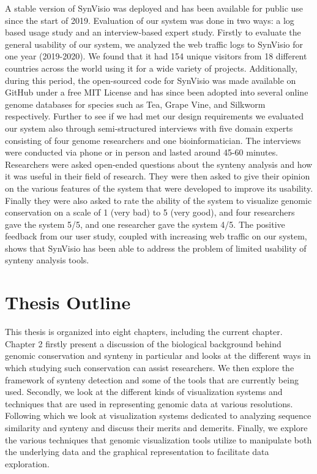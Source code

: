 A stable version of SynVisio was deployed and has been available for public use since the start of 2019. Evaluation of our system was done in two ways: a log based usage study and an interview-based expert study. Firstly to evaluate the general usability of our system, we analyzed the web traffic logs to SynVisio for one year (2019-2020). We found that it had 154 unique visitors from 18 different countries across the world using it for a wide variety of projects. Additionally, during this period, the open-sourced code for SynVisio was made available on GitHub under a free MIT License and has since been adopted into several online genome databases for species such as Tea, Grape Vine, and Silkworm respectively.
Further to see if we had met our design requirements we evaluated our system also  
through semi-structured interviews with five domain experts consisting of four genome researchers and one bioinformatician. The interviews were conducted via phone or in person and lasted around 45-60 minutes. Researchers were asked open-ended questions about the synteny analysis and how it was useful in their field of research. They were then asked to give their opinion on the various features of the system that were developed to improve its usability. Finally they were also asked to rate the ability of the system to visualize genomic conservation on a scale of 1 (very bad) to 5 (very good), and four researchers gave the system 5/5, and one researcher gave the system 4/5. The positive feedback from our user study, coupled with increasing web traffic on our system, shows that SynVisio has been able to address the problem of limited usability of synteny analysis tools.

\section{Thesis Outline}

This thesis is organized into eight chapters, including the current chapter. Chapter 2 firstly present a discussion of the biological background behind genomic conservation and synteny in particular and looks at the different ways in which studying such conservation can assist researchers. We then explore the framework of synteny detection and some of the tools that are currently being used. Secondly, we look at the different kinds of visualization systems and techniques that are used in representing genomic data at various resolutions. Following which we look at visualization systems dedicated to analyzing sequence similarity and synteny and discuss their merits and demerits. Finally, we explore the various techniques that genomic visualization tools utilize to manipulate both the underlying data and the graphical representation to facilitate data exploration.

